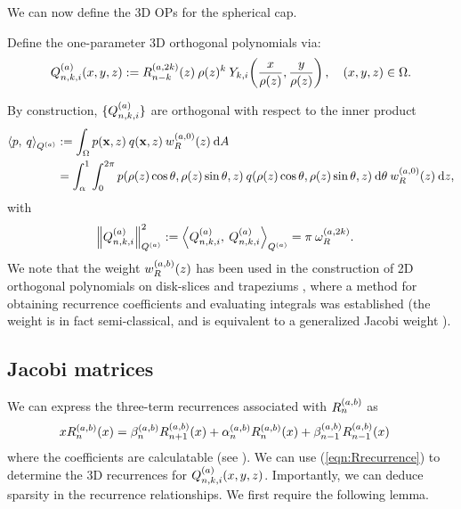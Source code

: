 \documentclass[11pt, oneside]{article}   	%
\begin{document}
We can now define the 3D OPs for the spherical cap.
\begin{definition}\label{def:constuction}
	Define the one-parameter 3D orthogonal polynomials via:
\begin{align}
	\scopnkia(x,y,z) := \genjacnmk^{(a,2k)}(z) \: \rho(z)^k \: \chki\fpr(\frac{x}{\rho(z)}, \frac{y}{\rho(z)}), \quad (x,y,z) \in \Omega.
\end{align}
\end{definition}

By construction, $\{Q_{n,k,i}^{(a)}\}$ are orthogonal with respect to the inner product
\begin{align*}
	\ip< p, \: q >_{\scopa} &:= \int_\Omega p(\xvec, z) \: q(\xvec, z) \: \genjacw^{(a,0)}(z) \: \D A \\
	&= \int_\alpha^1 \int_0^{2\pi} p(\rho(z) \cos\theta, \rho(z) \sin\theta, z) \: q(\rho(z) \cos\theta, \rho(z) \sin\theta, z) \: \D \theta \: \genjacw^{(a,0)}(z) \: \D z,
\end{align*}
with
\begin{align}
	\norm{\scopnkia}_{\scopa}^2 &:= \ip< \scopnkia, \: \scopnkia >_{\scopa} = \pi \: \normgenjac^{(a, 2k)}. \label{eqn:normscop}
\end{align}
We note that the weight $w_R^{(a,b)}(z)$ has been used in the construction of 2D orthogonal polynomials on disk-slices and trapeziums \cite{snowball2019sparse}, where a method for obtaining recurrence coefficients and evaluating integrals was established (the weight is in fact semi-classical, and is equivalent to a generalized Jacobi weight \cite[\S5]{magnus1995painleve}). 


\subsection{Jacobi matrices}\label{subsection:jacobimats}

We can express the three-term recurrences associated with $R_n^{(a,b)}$ as
\begin{align}
	x R_n^{(a,b)}(x) &= \beta_n^{(a,b)} R_{n+1}^{(a,b)}(x) + \alpha_n^{(a,b)} R_n^{(a,b)}(x) + \beta_{n-1}^{(a,b)} R_{n-1}^{(a,b)}(x) \label{eqn:Rrecurrence}
\end{align}
where the coefficients are calculatable (see \cite{snowball2019sparse}). We can use (\ref{eqn:Rrecurrence}) to determine the 3D recurrences for $Q_{n,k,i}^{(a)}(x,y,z)$. Importantly, we can deduce sparsity in the recurrence relationships.  We first require the following lemma.
\end{document}
